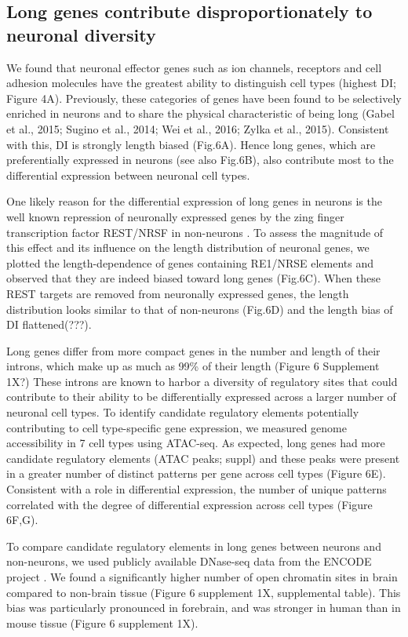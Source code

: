 \subsection{Long genes contribute disproportionately to neuronal diversity}

We found that neuronal effector genes such as ion channels, receptors and cell adhesion molecules have the greatest ability to distinguish cell types (highest DI; Figure 4A). Previously, these categories of genes have been found to be selectively enriched in neurons and to share the physical characteristic of being long (Gabel et al., 2015; Sugino et al., 2014; Wei et al., 2016; Zylka et al., 2015). Consistent with this, DI is strongly length biased (Fig.6A). Hence long genes, which are preferentially expressed in neurons (see also Fig.6B), also contribute most to the differential expression between neuronal cell types. 

One likely reason for the differential expression of long genes in neurons is the well known repression of neuronally expressed genes by the zing finger transcription factor REST/NRSF in non-neurons \cite{RN1}\cite{RN2a}. To assess the magnitude of this effect and its influence on the length distribution of neuronal genes, we plotted the length-dependence of genes containing RE1/NRSE elements and observed that they are indeed biased toward long genes (Fig.6C). When these REST targets are removed from neuronally expressed genes, the length distribution looks similar to that of non-neurons (Fig.6D) and the length bias of DI flattened(???).

Long genes differ from more compact genes in the number and length of their introns, which make up as much as 99\% of their length (Figure 6 Supplement 1X?) These introns are known to harbor a diversity of regulatory sites that could contribute to their ability to be differentially expressed across a larger number of neuronal cell types. To identify candidate regulatory elements potentially contributing to cell type-specific gene expression, we measured genome accessibility in 7 cell types using ATAC-seq. As expected, long genes had more candidate regulatory elements (ATAC peaks; suppl) and these peaks were present in a greater number of distinct patterns per gene across cell types (Figure 6E). Consistent with a role in differential expression, the number of unique patterns correlated with the degree of differential expression across cell types (Figure 6F,G).

To compare candidate regulatory elements in long genes between neurons and non-neurons, we used publicly available DNase-seq data from the ENCODE project \cite{Dunham_2012}. We found a significantly higher number of open chromatin sites in brain compared to non-brain tissue (Figure 6 supplement 1X, supplemental table). This bias was  particularly pronounced in forebrain, and was stronger in human than in mouse tissue (Figure 6 supplement 1X).